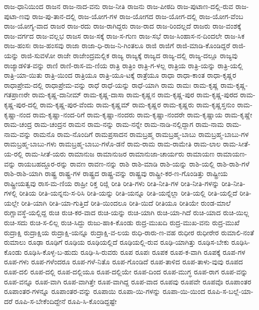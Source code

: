 {ರಾಜ-ಧಾನಿಯಿಂದ
ರಾಜನ
ರಾಜ-ನಾದ-ವನು
ರಾಜ-ನೀತಿ
ರಾಜನು
ರಾಜ-ಪೀಠದಿ
ರಾಜ-ಪುಟಾಣ-ದಲ್ಲಿ-ರುವ
ರಾಜ-ಪುಟಾ-ಣವು
ರಾಜ-ಪು-ತಾನ-ದಲ್ಲಿ
ರಾಜ-ಯೋಗ-ಗಳ
ರಾಜ-ಯೋಗದ
ರಾಜ-ಯೋಗ-ದಲ್ಲಿ
ರಾಜ-ಯೋಗ-ವೆಂಬ
ರಾಜ-ಯೋಗ್ಯ-ವಾದ
ರಾಜರ
ರಾಜ-ರದು
ರಾಜ-ರಾಗಿದ್ದರು
ರಾಜ-ರಾದ
ರಾಜ-ರಿಂದಲ್ಲದೆ
ರಾಜರು
ರಾಜ-ವಂಶಕ್ಕೆ
ರಾಜ-ವರ್ಗದ
ರಾಜ-ವಲ್ಲಭ
ರಾಜಸ
ರಾಜ-ಸಕ್ಕೆ
ರಾಜ-ಸ-ಗುಣ
ರಾಜ-ಸಭೆ
ರಾಜ-ಸಿಂಹಾಸ-ನ-ದಿಂದಲೇ
ರಾಜ-ಸಿಕ
ರಾಜ-ಹಂಸಃ
ರಾಜ-ಹಂಸವು
ರಾಜಾ
ರಾಜಾ-ಧಿ-ರಾಜ-ನಿ-ಗಿಂತಲೂ
ರಾಜಿ
ರಾಜಿಗೆ
ರಾಜಿ-ಮಾಡಿ-ಕೊಂಡಿದ್ದರೆ
ರಾಜಿ-ಯನ್ನು
ರಾಜಿ-ಸುವಳೋ
ರಾಜೇ
ರಾಜೇಂದ್ರಮಲ್ಲಿಕ
ರಾಜ್ಯ
ರಾಜ್ಯಕ್ಕೆ
ರಾಜ್ಯದ
ರಾಜ್ಯ-ದಲ್ಲಿ
ರಾಜ್ಯ-ದಲ್ಲೂ
ರಾಜ್ಯವು
ರಾಜ್ಯಾಡಳಿತ-ವನ್ನು
ರಾಣಿ
ರಾಣಿ-ರಾಸ-ಮ-ಣಿಯ
ರಾತ್ರಿ
ರಾತ್ರಿಂ
ರಾತ್ರಿ-ಗ-ಳಲ್ಲ
ರಾತ್ರಿಯ
ರಾತ್ರಿ-ಯನ್ನು
ರಾತ್ರಿ-ಯಲ್ಲಿ
ರಾತ್ರಿ-ಯಾ-ಯಿತು
ರಾತ್ರಿ-ಯಿಂದ
ರಾತ್ರಿಯೂ
ರಾತ್ರಿ-ಯೂ-ಟಕ್ಕೆ
ರಾತ್ರೆಯೂ
ರಾಧಾ
ರಾಧಾ-ಕಾಂತ
ರಾಧಾ-ಕೃಷ್ಣರ
ರಾಧಾಪ್ರೇಮ-ದಲ್ಲಿ
ರಾಧಾಪ್ರೇಮ-ವನ್ನು
ರಾಧೆ
ರಾಧೆ-ಯನ್ನು
ರಾಧೆ-ಯಾಗಿ
ರಾಮ
ರಾಮಃ
ರಾಮ-ಕೃಷ್ಣ
ರಾಮ-ಕೃಷ್ಣ-ಗತಪ್ರಾಣರೇ
ರಾಮ-ಕೃಷ್ಣ-ದಾನೀಮ್
ರಾಮ-ಕೃಷ್ಣ-ದಾಸಾ
ರಾಮ-ಕೃಷ್ಣನ
ರಾಮ-ಕೃಷ್ಣ-ಪುರ
ರಾಮ-ಕೃಷ್ಣ-ಪುರದ
ರಾಮ-ಕೃಷ್ಣ-ಪುರ-ದಲ್ಲಿ
ರಾಮ-ಕೃಷ್ಣ-ಪುರ-ವೆಂದು
ರಾಮ-ಕೃಷ್ಣಮ್
ರಾಮ-ಕೃಷ್ಣರ
ರಾಮ-ಕೃಷ್ಣರು
ರಾಮ-ಕೃಷ್ಣಸ್ತನುಂ
ರಾಮ-ಕೃಷ್ಣಾ-ನಂದ
ರಾಮ-ಕೃಷ್ಣಾ-ನಂದ-ರಿಗೆ
ರಾಮ-ಕೃಷ್ಣಾ-ನಂದರು
ರಾಮ-ಕೃಷ್ಣಾ-ನಂದರೇ
ರಾಮ-ಕೃಷ್ಣಾಯ
ರಾಮ-ಕೃಷ್ಣೇ
ರಾಮ-ಚಂದ್ರ
ರಾಮ-ಚಂದ್ರನ
ರಾಮನ
ರಾಮ-ನನ್ನು
ರಾಮ-ನನ್ನೇ
ರಾಮ-ನಾಡಿ-ನಲ್ಲಿದ್ದಾಗ
ರಾಮ-ನಾಮ
ರಾಮ-ನಾಮ-ವನ್ನು
ರಾಮನೊ
ರಾಮ-ನೊಂದಿಗೆ
ರಾಮಪ್ರಸಾದನ
ರಾಮಬ್ರಹ್ಮ
ರಾಮಬ್ರಹ್ಮ-ಬಾಬು
ರಾಮಬ್ರಹ್ಮ-ಬಾಬು-ಗಳ
ರಾಮಬ್ರಹ್ಮ-ಬಾಬು-ಗಳು
ರಾಮಬ್ರಹ್ಮ-ಬಾಬು-ಗಳೊ-ಡನೆ
ರಾಮ-ರಾಮ
ರಾಮ-ರಾಮೇತಿ
ರಾಮ-ಲಾಲ
ರಾಮ-ಸೀತೆ-ಯ-ರಲ್ಲಿ
ರಾಮ-ಸೀತೆ-ಯರು
ರಾಮಾನುಜ
ರಾಮಾನುಜರ
ರಾಮಾನುಜಾ-ಚಾರ್ಯರು
ರಾಮಾಯಣ
ರಾಮಾಯಣ-ವನ್ನು
ರಾಯಬಹದ್ದೂರ-ರನ್ನು
ರಾವಣ
ರಾವಣ-ನನ್ನು
ರಾಶಿ
ರಾಶಿ-ಮಾಡಿ
ರಾಶಿ-ಯನ್ನು
ರಾಶಿ-ಯಲ್ಲಿ
ರಾಶಿ-ರಾಶಿ-ಗಳೆ
ರಾಶಿ-ರಾಶಿ-ಯಾಗಿ
ರಾಷ್ಟ್ರ
ರಾಷ್ಟ್ರ-ಗಳ
ರಾಷ್ಟ್ರದ
ರಾಷ್ಟ್ರ-ವನ್ನು
ರಾಷ್ಟ್ರವು
ರಾಷ್ಟ್ರೀ-ಕರ-ಣ-ಗೊಂಡಿತ್ತು
ರಾಷ್ಟ್ರೀಯ
ರಾಷ್ಟ್ರೀಯತ್ವವು
ರಾಸ-ಮ-ಣಿಯ
ರಾಹ್ರೀ
ರಿಕ್ತ
ರಿಜ್ಲಿ
ರೀತಿ
ರೀತಿ-ಗಳು
ರೀತಿ-ನೀತಿ-ಗಳ
ರೀತಿ-ನೀತಿ-ಗಳನ್ನು
ರೀತಿ-ನೀತಿ-ಗಳಲ್ಲಿ
ರೀತಿಯ
ರೀತಿ-ಯನ್ನನು-ಸ-ರಿಸಿ
ರೀತಿ-ಯನ್ನು
ರೀತಿ-ಯನ್ನೂ
ರೀತಿ-ಯನ್ನೆಲ್ಲಾ
ರೀತಿ-ಯಲ್ಲಿ
ರೀತಿ-ಯಲ್ಲಿದೆ
ರೀತಿ-ಯಲ್ಲೇ
ರೀತಿ-ಯಾಗಿ
ರೀತಿ-ಯಾ-ಗುತ್ತಿದೆ
ರೀತಿ-ಯಿಂದಲೂ
ರೀತಿ-ಯಿದೆ
ರೀತಿಯೂ
ರೀತಿಯೇ
ರುಂಡ-ಮಾಲೆ
ರುಗ್ಣಾವಸ್ಥೆ-ಯಲ್ಲಿದ್ದ
ರುಚಿ
ರುಚಿ-ಕರ-ವಾದ
ರುಚಿ-ಯನ್ನು
ರುಚಿ-ಯಾಗಿ
ರುಚಿ-ಯಾ-ಗಿದೆ
ರುಚಿ-ಯಾದ
ರುಚಿ-ಯಿಲ್ಲ
ರುಚಿ-ಸದು
ರುಚಿ-ಸ-ಲಿಲ್ಲ
ರುಚಿ-ಸಿದ್ದು
ರುಜು-ಹಾಕಿ-ಕೊಂಡು
ರುದ್ರ-ಮುಖದಿ
ರುದ್ರ-ಮುಖ-ವನು
ರುದ್ರ-ಮುಖೆ
ರುದ್ರಾಕ್ಷಿ
ರುದ್ರಾಕ್ಷಿಯ
ರುದ್ರಾಕ್ಷಿ-ಯನ್ನೂ
ರುದ್ರಾಕ್ಷಿ-ವ-ಲಯ
ರುಧಿ-ರಾರು-ಣ-ವಹ
ರುಧೀರ
ರುಧೀರೇರ
ರುಮಾಲಿ-ನಂತೆ
ರುಮಾಲು
ರೂಢಾ
ರೂಢಿಗೆ
ರೂಢಿಯ
ರೂಢಿಯಲ್ಲಿದೆ
ರೂಢಿಯಲ್ಲಿ-ರುವ
ರೂಢಿ-ಯಾಗಿತ್ತು
ರೂಢಿಸ-ಬೇಕು
ರೂಢಿಸಿ-ಕೊಂಡು
ರೂಢಿಸಿ-ಕೊಳ್ಳ-ಬ-ಹುದು
ರೂಢಿ-ಸಿ-ರುವರು
ರೂಪ
ರೂಪಃ
ರೂಪಕ
ರೂಪ-ಕ-ವಾಗಿ
ರೂಪಕ್ಕೆ
ರೂಪ-ಗಳ
ರೂಪ-ಗಳು
ರೂಪ-ಗಳೆಂದರೂ
ರೂಪ-ಗಳೆ-ನಿತೊ
ರೂಪ-ಗೊಂಡಿದೆ
ರೂಪ-ತಾಳಿದ
ರೂಪ-ತಾಳು-ವುವು
ರೂಪದ
ರೂಪ-ದಲಿ
ರೂಪ-ದಲ್ಲಿ
ರೂಪ-ದಲ್ಲಿಯೂ
ರೂಪ-ದಲ್ಲಿಯೇ
ರೂಪ-ದಿಂದ
ರೂಪ-ಮುಗ್ಧ
ರೂಪ-ರಾಗ
ರೂಪ-ವನ್ನು
ರೂಪ-ವನ್ನೂ
ರೂಪ-ವಾಗಿ
ರೂಪ-ವಾಗಿತ್ತೇ
ರೂಪ-ವಾಗಿದ್ದ
ರೂಪ-ವಾದ
ರೂಪವು
ರೂಪವೇ
ರೂಪವೊ
ರೂಪಾಂತರ
ರೂಪಾಂತರ-ಗಳನ್ನೂ
ರೂಪಾಂತರ-ವನ್ನು
ರೂಪಾಯಿ
ರೂಪಾ-ಯಿ-ಗಳನ್ನು
ರೂಪಾ-ಯಿ-ಯಿಂದ
ರೂಪಿ-ಸ-ಬಲ್ಲೆ-ಯಾ-ದರೆ
ರೂಪಿ-ಸ-ಬೇಕೆಂದಿದ್ದೇನೆ
ರೂಪಿ-ಸಿ-ಕೊಂಡಿದ್ದಷ್ಟೇ
}
